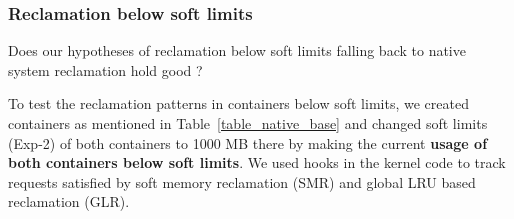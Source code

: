       \subsubsection{Reclamation below soft limits}
      
	Does our hypotheses of reclamation below soft limits falling back to native system reclamation hold good ?
	
	To test the reclamation patterns in containers below soft limits, we created containers as mentioned in Table~\ref{table_native_base} 
  and changed soft limits (Exp-2) of both containers to 1000 MB there by making the current \textbf{usage of both containers below soft 
  limits}. We used hooks in the kernel code to track requests satisfied by soft memory reclamation (SMR) and global LRU based reclamation 
  (GLR).
	
